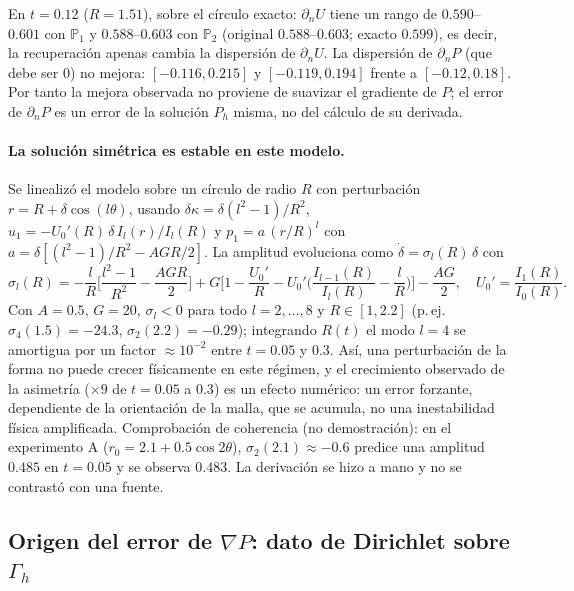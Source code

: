 En $t=0.12$ ($R=1.51$), sobre el círculo exacto: $\partial_nU$ tiene un rango de $0.590$--$0.601$ con $\mathbb{P}_1$ y $0.588$--$0.603$ con $\mathbb{P}_2$ (original $0.588$--$0.603$; exacto $0.599$), es decir, la recuperación apenas cambia la dispersión de $\partial_nU$. La dispersión de $\partial_nP$ (que debe ser $0$) no mejora: $[-0.116,0.215]$ y $[-0.119,0.194]$ frente a $[-0.12,0.18]$. Por tanto la mejora observada no proviene de suavizar el gradiente de $P$; el error de $\partial_nP$ es un error de la solución $P_h$ misma, no del cálculo de su derivada.

\paragraph{La solución simétrica es estable en este modelo.} Se linealizó el modelo sobre un círculo de radio $R$ con perturbación $r=R+\delta\cos(l\theta)$, usando $\delta\kappa=\delta(l^2-1)/R^2$, $u_1=-U_0'(R)\,\delta\,I_l(r)/I_l(R)$ y $p_1=a\,(r/R)^l$ con $a=\delta[(l^2-1)/R^2-AGR/2]$. La amplitud evoluciona como $\dot\delta=\sigma_l(R)\,\delta$ con
\[
\sigma_l(R)=-\frac{l}{R}\Big[\frac{l^2-1}{R^2}-\frac{AGR}{2}\Big]+G\Big[1-\frac{U_0'}{R}-U_0'\Big(\frac{I_{l-1}(R)}{I_l(R)}-\frac{l}{R}\Big)\Big]-\frac{AG}{2},\quad U_0'=\frac{I_1(R)}{I_0(R)}.
\]
Con $A=0.5$, $G=20$, $\sigma_l<0$ para todo $l=2,\dots,8$ y $R\in[1,2.2]$ (p.\,ej.\ $\sigma_4(1.5)=-24.3$, $\sigma_2(2.2)=-0.29$); integrando $R(t)$ el modo $l=4$ se amortigua por un factor $\approx10^{-2}$ entre $t=0.05$ y $0.3$. Así, una perturbación de la forma no puede crecer físicamente en este régimen, y el crecimiento observado de la asimetría ($\times9$ de $t=0.05$ a $0.3$) es un efecto numérico: un error forzante, dependiente de la orientación de la malla, que se acumula, no una inestabilidad física amplificada. Comprobación de coherencia (no demostración): en el experimento A ($r_0=2.1+0.5\cos2\theta$), $\sigma_2(2.1)\approx-0.6$ predice una amplitud $0.485$ en $t=0.05$ y se observa $0.483$. La derivación se hizo a mano y no se contrastó con una fuente.

\subsection{Origen del error de $\nabla P$: dato de Dirichlet sobre $\Gamma_h$}

